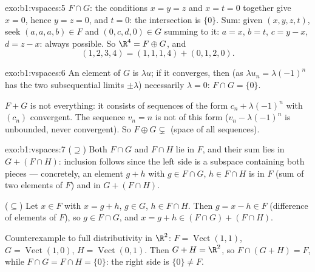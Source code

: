 \begin{solution}{exo:b1:vspaces:5}
$F \cap G$: the conditions $x = y = z$ and $x = t = 0$ together give
$x = 0$, hence $y = z = 0$, and $t = 0$: the intersection is
$\{0\}$. Sum: given $(x,y,z,t)$, seek $(a,a,a,b) \in F$ and
$(0,c,d,0) \in G$ summing to it: $a = x$, $b = t$, $c = y - x$, $d =
z - x$: always possible. So $\R^4 = F \oplus G$, and
\[
(1,2,3,4) = (1,1,1,4) + (0,1,2,0) .
\]
\end{solution}

\begin{solution}{exo:b1:vspaces:6}
An element of $G$ is $\lambda u$; if it converges, then (as
$\lambda u_n = \lambda(-1)^n$ has the two subsequential limits $\pm
\lambda$) necessarily $\lambda = 0$: $F \cap G = \{0\}$.

$F + G$ is not everything: it consists of sequences of the form
$c_n + \lambda(-1)^n$ with $(c_n)$ convergent. The sequence $v_n =
n$ is not of this form ($v_n - \lambda(-1)^n$ is unbounded, never
convergent). So $F \oplus G \subsetneq$ (space of all sequences).
\end{solution}

\begin{solution}{exo:b1:vspaces:7}
($\supseteq$) Both $F \cap G$ and $F \cap H$ lie in $F$, and their
sum lies in $G + (F \cap H)$: inclusion follows since the left side
is a subspace containing both pieces --- concretely, an element $g +
h$ with $g \in F\cap G$, $h \in F \cap H$ is in $F$ (sum of two
elements of $F$) and in $G + (F \cap H)$.

($\subseteq$) Let $x \in F$ with $x = g + h$, $g \in G$, $h \in F
\cap H$. Then $g = x - h \in F$ (difference of elements of $F$), so
$g \in F \cap G$, and $x = g + h \in (F \cap G) + (F \cap H)$.

Counterexample to full distributivity in $\R^2$: $F =
\operatorname{Vect}(1,1)$, $G = \operatorname{Vect}(1,0)$, $H =
\operatorname{Vect}(0,1)$. Then $G + H = \R^2$, so $F \cap (G+H) =
F$, while $F \cap G = F \cap H = \{0\}$: the right side is $\{0\}
\neq F$.
\end{solution}

